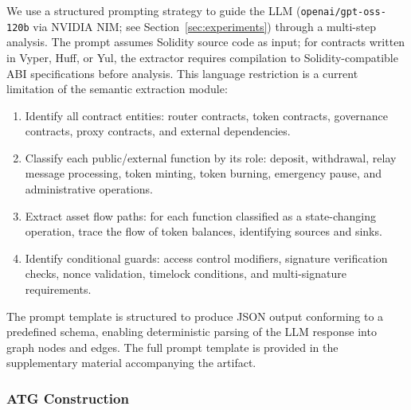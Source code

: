 \documentclass[journal]{IEEEtran}
\begin{document}
We use a structured prompting strategy to guide the LLM (\texttt{openai/gpt-oss-120b} via NVIDIA NIM; see Section~\ref{sec:experiments}) through a multi-step analysis. The prompt assumes Solidity source code as input; for contracts written in Vyper, Huff, or Yul, the extractor requires compilation to Solidity-compatible ABI specifications before analysis. This language restriction is a current limitation of the semantic extraction module:

\begin{enumerate}
    \item Identify all contract entities: router contracts, token contracts, governance contracts, proxy contracts, and external dependencies.
    \item Classify each public/external function by its role: deposit, withdrawal, relay message processing, token minting, token burning, emergency pause, and administrative operations.
    \item Extract asset flow paths: for each function classified as a state-changing operation, trace the flow of token balances, identifying sources and sinks.
    \item Identify conditional guards: access control modifiers, signature verification checks, nonce validation, timelock conditions, and multi-signature requirements.
\end{enumerate}

The prompt template is structured to produce JSON output conforming to a predefined schema, enabling deterministic parsing of the LLM response into graph nodes and edges. The full prompt template is provided in the supplementary material accompanying the artifact.

\subsubsection{ATG Construction}
\end{document}
